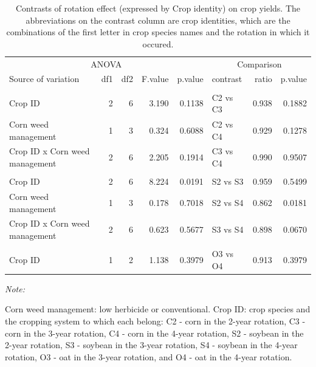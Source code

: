 \documentclass[
]{article}
\begin{document}
\begin{table}

\caption{\label{tab:crop-jt-ct}Contrasts of rotation effect (expressed by Crop identity) on crop yields. The abbreviations on the contrast column are crop identities, which are the combinations of the first letter in crop species names and the rotation in which it occured.}
\centering
\begin{threeparttable}
\begin{tabular}[t]{lrrr>{}r|lrr}
\toprule
\multicolumn{5}{c}{ANOVA} & \multicolumn{3}{c}{Comparison} \\
\cmidrule(l{3pt}r{3pt}){1-5} \cmidrule(l{3pt}r{3pt}){6-8}
Source of variation & df1 & df2 & F.value & p.value & contrast & ratio & p.value\\
\midrule
\addlinespace[0.3em]
\multicolumn{8}{l}{\textbf{(A) - Corn}}\\
\hspace{1em}Crop ID & 2 & 6 & 3.190 & 0.1138 & C2 vs C3 & 0.938 & 0.1882\\
\hspace{1em}Corn weed management & 1 & 3 & 0.324 & 0.6088 & C2 vs C4 & 0.929 & 0.1278\\
\hspace{1em}Crop ID x Corn weed management & 2 & 6 & 2.205 & 0.1914 & C3 vs C4 & 0.990 & 0.9507\\
\addlinespace[0.3em]
\multicolumn{8}{l}{\textbf{(B) - Soybean}}\\
\hspace{1em}Crop ID & 2 & 6 & 8.224 & 0.0191 & S2 vs S3 & 0.959 & 0.5499\\
\hspace{1em}Corn weed management & 1 & 3 & 0.178 & 0.7018 & S2 vs S4 & 0.862 & 0.0181\\
\hspace{1em}Crop ID x Corn weed management & 2 & 6 & 0.623 & 0.5677 & S3 vs S4 & 0.898 & 0.0670\\
\addlinespace[0.3em]
\multicolumn{8}{l}{\textbf{(C) - Oat}}\\
\hspace{1em}Crop ID & 1 & 2 & 1.138 & 0.3979 & O3 vs O4 & 0.913 & 0.3979\\
\bottomrule
\end{tabular}
\begin{tablenotes}[para]
\item \textit{Note: } 
\item Corn weed management: low herbicide or conventional. Crop ID: crop species and the cropping system to which each belong: C2 - corn in the 2-year rotation, C3 - corn in the 3-year rotation, C4 - corn in the 4-year rotation, S2 - soybean in the 2-year rotation, S3 - soybean in the 3-year rotation, S4 - soybean in the 4-year rotation, O3 - oat in the 3-year rotation, and O4 - oat in the 4-year rotation.
\end{tablenotes}
\end{threeparttable}
\end{table}
\end{document}
